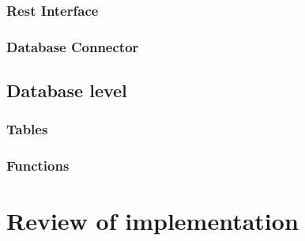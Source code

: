\subsubsection{Rest Interface}

\subsubsection{Database Connector}


\subsection{Database level}

\subsubsection{Tables}

\subsubsection{Functions}


\section{Review of implementation}